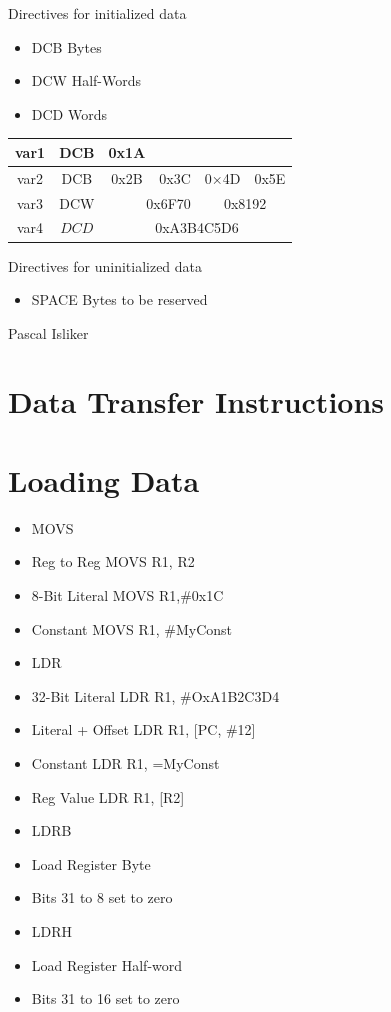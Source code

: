 \documentclass[10pt]{article}
\begin{document}
Directives for initialized data

\begin{itemize}
  \item DCB Bytes
  \item DCW Half-Words
  \item DCD Words
\end{itemize}

\begin{center}
\begin{tabular}{|c|c|c|c|c|c|}
\hline
var1 & DCB & 0x1A &  &  &  \\
\hline
var2 & DCB & 0x2B & 0x3C & 0×4D & 0x5E \\
\hline
var3 & DCW & \multicolumn{2}{|r|}{0x6F70} & \multicolumn{2}{|c|}{0x8192} \\
\hline
var4 & $D C D$ & \multicolumn{4}{|c|}{0xA3B4C5D6} \\
\hline
\end{tabular}
\end{center}

Directives for uninitialized data

\begin{itemize}
  \item SPACE Bytes to be reserved
\end{itemize}

Pascal Isliker

\section*{Data Transfer Instructions}
\section*{Loading Data}
\begin{itemize}
  \item MOVS
  \item Reg to Reg MOVS R1, R2
  \item 8-Bit Literal MOVS R1,\#0x1C
  \item Constant MOVS R1, \#MyConst
  \item LDR
  \item 32-Bit Literal LDR R1, \#OxA1B2C3D4
  \item Literal + Offset LDR R1, [PC, \#12]
  \item Constant LDR R1, =MyConst
  \item Reg Value LDR R1, [R2]
  \item LDRB
  \item Load Register Byte
  \item Bits 31 to 8 set to zero
  \item LDRH
  \item Load Register Half-word
  \item Bits 31 to 16 set to zero
\end{itemize}
\end{document}
